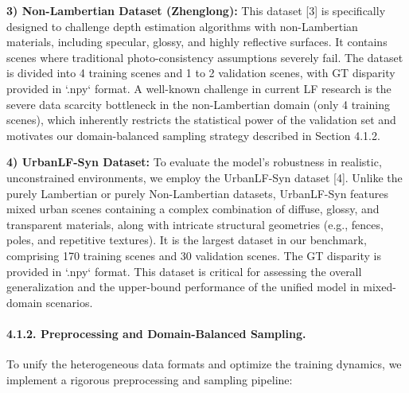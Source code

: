 \textbf{3) Non-Lambertian Dataset (Zhenglong):} 
This dataset [3] is specifically designed to challenge depth estimation algorithms with non-Lambertian materials, including specular, glossy, and highly reflective surfaces. It contains scenes where traditional photo-consistency assumptions severely fail. The dataset is divided into 4 training scenes and 1 to 2 validation scenes, with GT disparity provided in `.npy` format. A well-known challenge in current LF research is the severe data scarcity bottleneck in the non-Lambertian domain (only 4 training scenes), which inherently restricts the statistical power of the validation set and motivates our domain-balanced sampling strategy described in Section 4.1.2.

\textbf{4) UrbanLF-Syn Dataset:} 
To evaluate the model's robustness in realistic, unconstrained environments, we employ the UrbanLF-Syn dataset [4]. Unlike the purely Lambertian or purely Non-Lambertian datasets, UrbanLF-Syn features mixed urban scenes containing a complex combination of diffuse, glossy, and transparent materials, along with intricate structural geometries (e.g., fences, poles, and repetitive textures). It is the largest dataset in our benchmark, comprising 170 training scenes and 30 validation scenes. The GT disparity is provided in `.npy` format. This dataset is critical for assessing the overall generalization and the upper-bound performance of the unified model in mixed-domain scenarios.

\paragraph{4.1.2. Preprocessing and Domain-Balanced Sampling.}

To unify the heterogeneous data formats and optimize the training dynamics, we implement a rigorous preprocessing and sampling pipeline:

